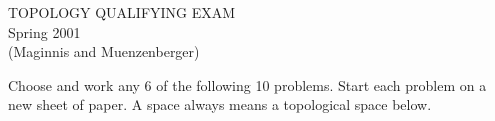 \documentclass[12pt]{article}
\begin{document}
\begin{large}

\begin{center}
   TOPOLOGY QUALIFYING EXAM\\
   Spring 2001 \\
   (Maginnis and Muenzenberger)\\
\end{center}

\end{large}

\vspace{.2in}

Choose and work any 6 of the following 10 problems.
Start each problem on a new sheet of paper.
A space always means a topological space below.
\end{document}
